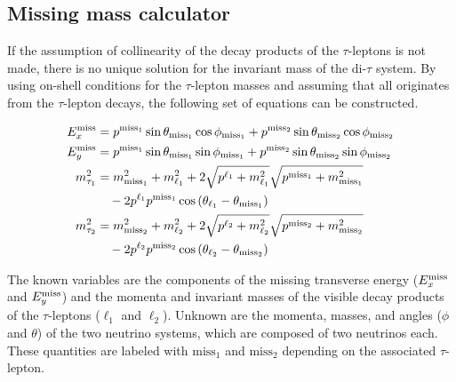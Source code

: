 \subsection{Missing mass calculator}\label{sub:event_selection:mmc}

If the assumption of collinearity of the decay products of the $\tau$-leptons is not made, there
is no unique solution for the invariant mass of the di-$\tau$ system.
By using on-shell conditions for the $\tau$-lepton masses and assuming
that all \etmiss{} originates from the $ \tau$-lepton decays,
the following set of equations can be constructed.

\begin{equation}
    \label{eq:mmc:equations}
    \begin{aligned}
        E_x^\text{miss} &= p^{\text{miss}_1} \sin \theta_{\text{miss}_1} \cos \phi_{\text{miss}_1} + p^{\text{miss}_2} \sin \theta_{\text{miss}_2} \cos \phi_{\text{miss}_2} \\
        E_y^\text{miss} &= p^{\text{miss}_1} \sin \theta_{\text{miss}_1} \sin \phi_{\text{miss}_1} + p^{\text{miss}_2} \sin \theta_{\text{miss}_2} \sin \phi_{\text{miss}_2} \\
        m_{\tau_1}^2 &= m_{\text{miss}_1}^2 + m_{\ell_1}^2 + 2 \sqrt{p^{\ell_1} + m_{\ell_1}^2} \sqrt{p^{\text{miss}_1} + m_{\text{miss}_1}^2} \\ 
                     & \quad - 2 p^{\ell_1} p^{\text{miss}_1} \cos{(\theta_{\ell_1} - \theta_{\text{miss}_1})} \\
        m_{\tau_2}^2 &= m_{\text{miss}_2}^2 + m_{\ell_2}^2 + 2 \sqrt{p^{\ell_2} + m_{\ell_2}^2} \sqrt{p^{\text{miss}_2} + m_{\text{miss}_2}^2}\\
                     & \quad - 2 p^{\ell_2} p^{\text{miss}_2} \cos{(\theta_{\ell_2} - \theta_{\text{miss}_2})}
    \end{aligned}
\end{equation}

The known variables are the components of the missing transverse energy ($E_x^\text{miss}$ and $E_y^\text{miss}$)
and the momenta and invariant masses of the visible decay products of the $\tau$-leptons ($\ell_1$ and $\ell_2$).
Unknown are the momenta, masses, and angles ($\phi$ and $\theta$) of the two neutrino systems, which are composed of two neutrinos each.
These quantities are labeled with $\text{miss}_1$ and $\text{miss}_2$ depending on the associated $\tau$-lepton.

